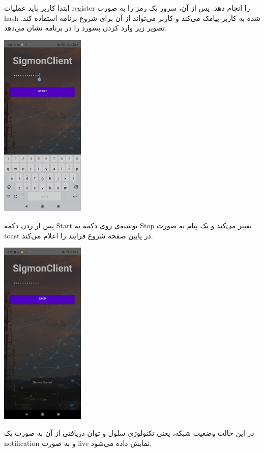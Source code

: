 \documentclass{article}
\begin{document}
ابتدا کاربر باید عملیات register را انجام دهد. پس از آن، سرور یک رمز را به صورت hash شده به کاربر پیامک می‌کند و کاربر می‌تواند از آن برای شروع برنامه استفاده کند. تصویر زیر وارد کردن پسورد را در برنامه نشان می‌دهد.
\singlespacing

\includegraphics[width=0.3\textwidth]{pass.jpg}\par\vspace{1cm}
پس از زدن دکمه Start نوشته‌ی روی دکمه به Stop تغییر می‌کند و یک پیام به صورت toast در پایین صفحه شروع فرایند را اعلام می‌کند.
\singlespacing

\includegraphics[width=0.3\textwidth]{button_change.jpg}\par\vspace{1cm}
در این حالت وضعیت شبکه، یعنی تکنولوژی سلول و توان دریافتی از آن به صورت یک notification و به صورت live نمایش داده می‌شود.
\singlespacing
\end{document}
